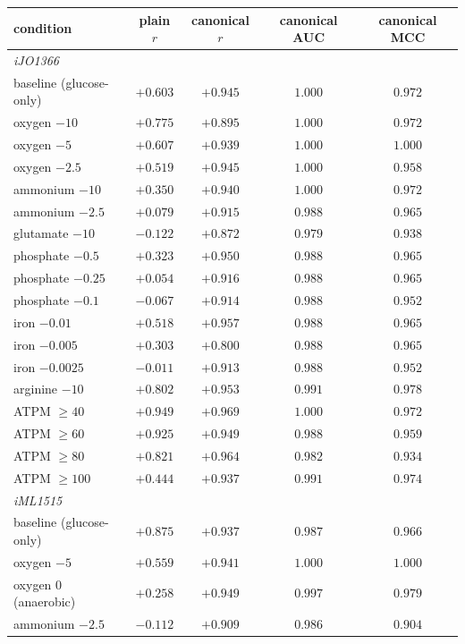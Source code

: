 \documentclass[11pt,a4paper]{article}
\theoremstyle{plain}
\theoremstyle{definition}
\theoremstyle{remark}
\begin{document}
\begin{table}[t]
\centering
\small
\begin{tabular}{lcccc}
\hline
condition & plain $r$ & canonical $r$ & canonical AUC & canonical MCC \\
\hline
\multicolumn{5}{l}{\emph{iJO1366}}\\
baseline (glucose-only) & $+0.603$ & $+0.945$ & $1.000$ & $0.972$ \\
oxygen $-10$ & $+0.775$ & $+0.895$ & $1.000$ & $0.972$ \\
oxygen $-5$ & $+0.607$ & $+0.939$ & $1.000$ & $1.000$ \\
oxygen $-2.5$ & $+0.519$ & $+0.945$ & $1.000$ & $0.958$ \\
ammonium $-10$ & $+0.350$ & $+0.940$ & $1.000$ & $0.972$ \\
ammonium $-2.5$ & $+0.079$ & $+0.915$ & $0.988$ & $0.965$ \\
glutamate $-10$ & $-0.122$ & $+0.872$ & $0.979$ & $0.938$ \\
phosphate $-0.5$ & $+0.323$ & $+0.950$ & $0.988$ & $0.965$ \\
phosphate $-0.25$ & $+0.054$ & $+0.916$ & $0.988$ & $0.965$ \\
phosphate $-0.1$ & $-0.067$ & $+0.914$ & $0.988$ & $0.952$ \\
iron $-0.01$ & $+0.518$ & $+0.957$ & $0.988$ & $0.965$ \\
iron $-0.005$ & $+0.303$ & $+0.800$ & $0.988$ & $0.965$ \\
iron $-0.0025$ & $-0.011$ & $+0.913$ & $0.988$ & $0.952$ \\
arginine $-10$ & $+0.802$ & $+0.953$ & $0.991$ & $0.978$ \\
ATPM $\ge 40$ & $+0.949$ & $+0.969$ & $1.000$ & $0.972$ \\
ATPM $\ge 60$ & $+0.925$ & $+0.949$ & $0.988$ & $0.959$ \\
ATPM $\ge 80$ & $+0.821$ & $+0.964$ & $0.982$ & $0.934$ \\
ATPM $\ge 100$ & $+0.444$ & $+0.937$ & $0.991$ & $0.974$ \\
\multicolumn{5}{l}{\emph{iML1515}}\\
baseline (glucose-only) & $+0.875$ & $+0.937$ & $0.987$ & $0.966$ \\
oxygen $-5$ & $+0.559$ & $+0.941$ & $1.000$ & $1.000$ \\
oxygen $0$ (anaerobic) & $+0.258$ & $+0.949$ & $0.997$ & $0.979$ \\
ammonium $-2.5$ & $-0.112$ & $+0.909$ & $0.986$ & $0.904$ \\

\end{tabular}
\end{table}
\end{document}
